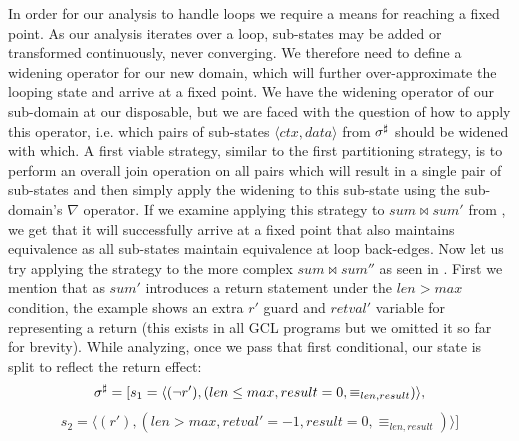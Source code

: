 In order for our analysis to handle loops we require a means for reaching a fixed point. As our analysis iterates over a loop, sub-states may be added or transformed continuously, never converging. We therefore need to define a widening operator for our new domain, which will further over-approximate the looping state and arrive at a fixed point. We have the widening operator of our sub-domain at our disposable, but we are faced with the question of how to apply this operator, i.e. which pairs of sub-states $\langle ctx , data \rangle$ from $\sigma^\sharp$ should be widened with which. A first viable strategy, similar to the first partitioning strategy, is to perform an overall join operation on all pairs which will result in a single pair of sub-states and then simply apply the widening to this sub-state using the sub-domain's $\nabla$ operator. If we examine applying this strategy to $sum \bowtie sum'$ from , we get that it will successfully arrive at a fixed point that also maintains equivalence as all sub-states maintain equivalence at loop back-edges. Now let us try applying the strategy to the more complex $sum \bowtie sum''$ as seen in . First we mention that as $sum'$ introduces a return statement under the $len > max$ condition, the example shows an extra $r'$ guard and $retval'$ variable for representing a return (this exists in all GCL programs but we omitted it so far for brevity). While analyzing, once we pass that first conditional, our state is split to reflect the return effect:
{\footnotesize
\[
\sigma^\sharp = [ s_1 = \langle (\neg r'),(len \leq max, result = 0, \equiv_{len,result}) \rangle,
\]
\[
s_2 = \langle (r'),(len > max, retval' = -1, result = 0, \equiv_{len,result}) \rangle ]
\]
}


